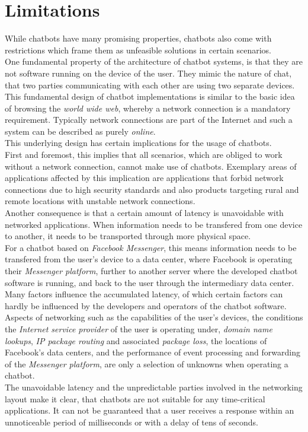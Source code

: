 \section{Limitations}
\label{limitations}


While chatbots have many promising properties, chatbots also come with restrictions
which frame them as unfeasible solutions in certain scenarios.
\\

One fundamental property of the architecture of chatbot systems,
is that they are not software running on the device of the user.
They mimic the nature of chat, that two parties communicating with each other are using two separate devices.
This fundamental design of chatbot implementations is similar to the basic
idea of browsing the \emph{world wide web}, whereby a network connection is a mandatory requirement.
Typically network connections are part of the Internet
and such a system can be described as purely \emph{online}.
\\
This underlying design has certain implications for the usage of chatbots.
\\

First and foremost, this implies that all scenarios, which are obliged to work without a network connection,
cannot make use of chatbots.
Exemplary areas of applications affected by this implication are
applications that forbid network connections due to high security standards
and also products targeting rural and remote locations with unstable network connections.
\\

Another consequence is that a certain amount of latency is unavoidable with networked applications.
When information needs to be transfered from one device to another,
it needs to be transported through more physical space.
\\
For a chatbot based on \emph{Facebook Messenger},
this means information needs to be transfered from the user's device to a data center,
where Facebook is operating their \emph{Messenger platform},
further to another server where the developed chatbot software is running,
and back to the user through the intermediary data center.
Many factors influence the accumulated latency,
of which certain factors can hardly be influenced by the developers and operators of the chatbot software.
Aspects of networking such as the capabilities of the user's devices,
the conditions the \emph{Internet service provider} of the user is operating under,
\emph{domain name lookups},
\emph{IP package routing} and associated \emph{package loss},
the locations of Facebook's data centers,
and the performance of event processing and forwarding of the \emph{Messenger platform},
are only a selection of unknowns when operating a chatbot.
\\
The unavoidable latency and the unpredictable parties involved in the networking layout
make it clear, that chatbots are not suitable for any time-critical applications.
It can not be guaranteed that a user receives a response within an unnoticeable period of milliseconds or with a delay of tens of seconds.
\\

